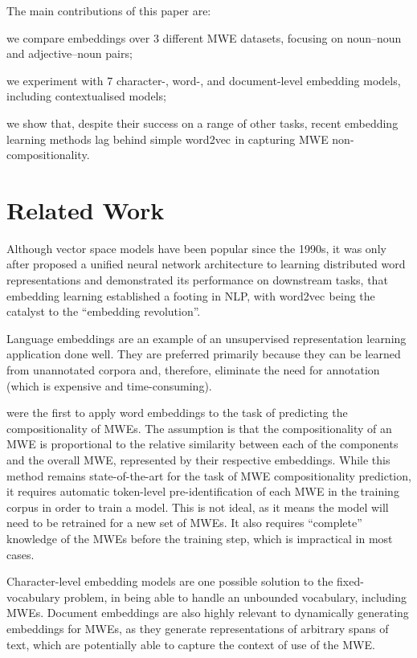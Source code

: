 \documentclass[11pt,a4paper]{article}
\newcommand{\embmethod}[2][]{\textsf{#2}$_{\text{#1}}$\xspace}
\newcommand{\wordtovec}{\embmethod{word2vec}}
\begin{document}
The main contributions of this paper are:
\begin{compactenum}[(i)]
\item we compare embeddings over 3 different MWE datasets, focusing on noun--noun and adjective--noun pairs;
\item we experiment with 7 character-, word-, and document-level embedding models, including contextualised models;
\item we show that, despite their success on a range of other tasks, recent embedding learning methods lag behind simple \wordtovec in capturing MWE non-compositionality.
\end{compactenum}

\section{Related Work}
Although vector space models have been popular since the 1990s, it was only after \citet{Coll2018} proposed a unified neural network architecture to learning distributed word representations and demonstrated its performance on downstream tasks, that embedding learning established a footing in NLP, with \wordtovec \cite{Mikolov2013} being the catalyst to the ``embedding revolution''.

Language embeddings are an example of an unsupervised representation learning application done well. They are preferred primarily because they can be learned from unannotated corpora and, therefore, eliminate the need for annotation (which is expensive and time-consuming).

\citet{Salehi2015} were the first to apply word embeddings to the task of predicting the compositionality of MWEs. The assumption is that the compositionality of an MWE is proportional to the relative similarity between each of the components and the overall MWE, represented by their respective embeddings. While this method remains state-of-the-art for the task of MWE compositionality prediction, it requires automatic token-level pre-identification of each MWE in the training corpus in order to train a model. This is not ideal, as it means the model will need to be retrained for a new set of MWEs. It also requires ``complete'' knowledge of the MWEs before the training step, which is impractical in most cases.

Character-level embedding models \cite{Hakimi2018} are one possible solution to the fixed-vocabulary problem, in being able to handle an unbounded vocabulary, including MWEs. Document embeddings \cite{Le+:2014,Conneau2017} are also highly relevant to dynamically generating embeddings for MWEs, as they generate representations of arbitrary spans of text, which are potentially able to capture the context of use of the MWE.
\end{document}

